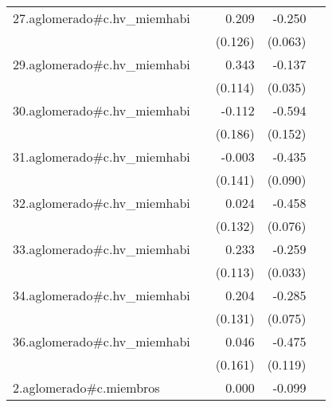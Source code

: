 {\begin{longtable}{l*{4}{D{.}{.}{-1}}}
\addlinespace
27.aglomerado#c.hv\_miemhabi&                     &       0.209         &      -0.250\sym{***}&                     \\
            &                     &     (0.126)         &     (0.063)         &                     \\
\addlinespace
29.aglomerado#c.hv\_miemhabi&                     &       0.343\sym{**} &      -0.137\sym{***}&                     \\
            &                     &     (0.114)         &     (0.035)         &                     \\
\addlinespace
30.aglomerado#c.hv\_miemhabi&                     &      -0.112         &      -0.594\sym{***}&                     \\
            &                     &     (0.186)         &     (0.152)         &                     \\
\addlinespace
31.aglomerado#c.hv\_miemhabi&                     &      -0.003         &      -0.435\sym{***}&                     \\
            &                     &     (0.141)         &     (0.090)         &                     \\
\addlinespace
32.aglomerado#c.hv\_miemhabi&                     &       0.024         &      -0.458\sym{***}&                     \\
            &                     &     (0.132)         &     (0.076)         &                     \\
\addlinespace
33.aglomerado#c.hv\_miemhabi&                     &       0.233\sym{*}  &      -0.259\sym{***}&                     \\
            &                     &     (0.113)         &     (0.033)         &                     \\
\addlinespace
34.aglomerado#c.hv\_miemhabi&                     &       0.204         &      -0.285\sym{***}&                     \\
            &                     &     (0.131)         &     (0.075)         &                     \\
\addlinespace
36.aglomerado#c.hv\_miemhabi&                     &       0.046         &      -0.475\sym{***}&                     \\
            &                     &     (0.161)         &     (0.119)         &                     \\
\addlinespace
2.aglomerado#c.miembros&                     &       0.000         &      -0.099\sym{***}&                     \\

\end{longtable}}

